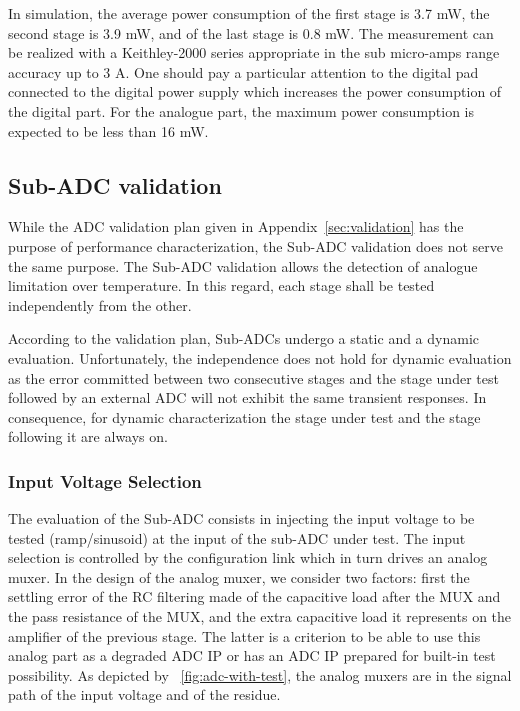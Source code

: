 In simulation, the average power consumption of the first stage is 3.7 mW, the second stage is 3.9 mW, and of the last stage is 0.8 mW. The measurement can be realized with a Keithley-2000 series appropriate in the sub micro-amps range accuracy up to 3 A. One should pay a particular attention to the digital pad connected to the digital power supply which increases the power consumption of the digital part. For the analogue part, the maximum power consumption is expected to be less than 16 mW.

\subsection{Sub-ADC validation}
While the ADC validation plan given in Appendix~\ref{sec:validation} has the purpose of performance characterization, the Sub-ADC validation does not serve the same purpose. The Sub-ADC validation allows the detection of analogue limitation over temperature. In this regard, each stage shall be tested independently from the other.

According to the validation plan, Sub-ADCs undergo a static and a dynamic evaluation. Unfortunately, the independence does not hold for dynamic evaluation as the error committed between two consecutive stages and the stage under test followed by an external ADC will not exhibit the same transient responses. In consequence, for dynamic characterization the stage under test and the stage following it are always on.

    \subsubsection{Input Voltage Selection}
The evaluation of the Sub-ADC consists in injecting the input voltage to be tested (ramp/sinusoid) at the input of the sub-ADC under test. The input selection is controlled by the configuration link which in turn drives an analog muxer. In the design of the analog muxer, we consider two factors: first the settling error of the RC filtering made of the capacitive load after the MUX and the pass resistance of the MUX, and the extra capacitive load it represents on the amplifier of the previous stage. The latter is a criterion to be able to use this analog part as a degraded ADC IP or has an ADC IP prepared for built-in test possibility. As depicted by \figurename~\ref{fig:adc-with-test}, the analog muxers are in the signal path of the input voltage and of the residue.

